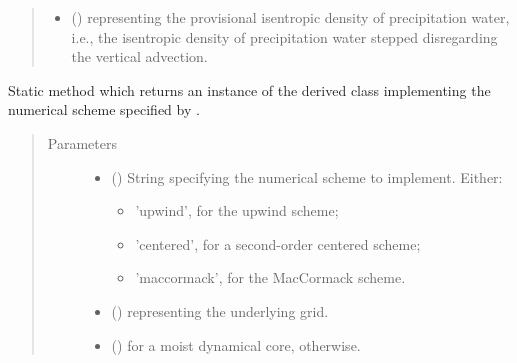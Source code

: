 \documentclass[letterpaper,10pt,english]{sphinxmanual}
\begin{document}
\begin{fulllineitems}
\begin{fulllineitems}
\begin{quote}
\begin{description}
\begin{itemize}
\item {} 
 () \textendash{}  representing the provisional isentropic density of precipitation water,
i.e., the isentropic density of precipitation water stepped disregarding the vertical advection.

\end{itemize}

\end{description}\end{quote}

\end{fulllineitems}


\begin{fulllineitems}
\label{\detokenize{api:dycore.flux_isentropic.FluxIsentropic.factory}}
Static method which returns an instance of the derived class implementing the numerical scheme
specified by .
\begin{quote}\begin{description}
\item[{Parameters}] \leavevmode\begin{itemize}
\item {} 
 () \textendash{} 
String specifying the numerical scheme to implement. Either:
\begin{itemize}
\item {} 
’upwind’, for the upwind scheme;

\item {} 
’centered’, for a second-order centered scheme;

\item {} 
’maccormack’, for the MacCormack scheme.

\end{itemize}


\item {} 
 () \textendash{} {\hyperref[\detokenize{api:grids.grid_xyz.GridXYZ}]{}} representing the underlying grid.

\item {} 
 () \textendash{}  for a moist dynamical core,  otherwise.


\end{itemize}
\end{description}
\end{quote}
\end{fulllineitems}
\end{fulllineitems}
\end{document}
